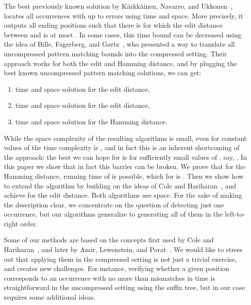 \documentclass[runningheads]{llncs}
\begin{document}
The best previously known solution by K{\"a}rkk{\"a}inen, Navarro, and Ukkonen~\cite{Juha}, locates all  occurrences with up to  errors using  time and  space. More precisely, it outputs all ending positions  such that there is  for which the edit distance between  and  is at most . In some cases, this time bound can be decreased using the idea of Bille, Fagerberg, and G{\o}rtz~\cite{Bille}, who presented a way to translate all uncompressed pattern matching bounds into the compressed setting. Their approach works for both the edit and Hamming distance, and by plugging the best known uncompressed pattern matching solutions, we can get:
\begin{enumerate}
\item  time and  space solution for the edit distance,
\item  time and  space solution for the edit distance,
\item  time and  space solution for the Hamming distance.
\end{enumerate}
While the space complexity of the resulting algorithms is small, even for constant values of  the time complexity is , and in fact this is an inherent shortcoming of the approach: the best we can hope for is  for sufficiently small values of , say, . In this paper we show that in fact this barrier can be broken. We prove that for the Hamming distance, running time of  is possible, which for  is . Then we show how to extend the algorithm by building on the ideas of Cole and Hariharan~\cite{ColeHariharan}, and achieve  for the edit distance. Both algorithms use  space. For the sake of making the description clear, we concentrate on the question of detecting just one occurrence, but our algorithms generalize to generating all of them in the left-to-right order.


Some of our methods are based on the concepts first used by Cole and Hariharan~\cite{ColeHariharan}, and later by Amir, Lewenstein, and Porat~\cite{AmirMismatches}. We would like to
stress out that applying them in the compressed setting is not just a trivial exercise, and creates new challenges. For instance, verifying whether a given position corresponds
to an occurrence with no more than  mismatches in  time is straightforward in the uncompressed setting using the suffix tree, but in our case requires some additional ideas.
\end{document}
